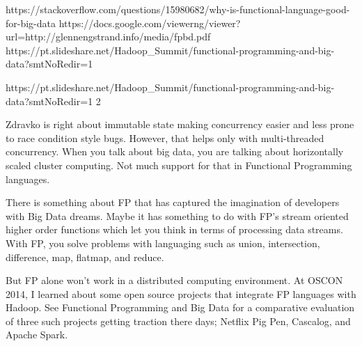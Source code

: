 https://stackoverflow.com/questions/15980682/why-is-functional-language-good-for-big-data
https://docs.google.com/viewerng/viewer?url=http://glennengstrand.info/media/fpbd.pdf
https://pt.slideshare.net/Hadoop_Summit/functional-programming-and-big-data?smtNoRedir=1

https://pt.slideshare.net/Hadoop_Summit/functional-programming-and-big-data?smtNoRedir=1
2

Zdravko is right about immutable state making concurrency easier and less prone to race condition style bugs. However, that helps only with multi-threaded concurrency. When you talk about big data, you are talking about horizontally scaled cluster computing. Not much support for that in Functional Programming languages.

There is something about FP that has captured the imagination of developers with Big Data dreams. Maybe it has something to do with FP's stream oriented higher order functions which let you think in terms of processing data streams. With FP, you solve problems with languaging such as union, intersection, difference, map, flatmap, and reduce.

But FP alone won't work in a distributed computing environment. At OSCON 2014, I learned about some open source projects that integrate FP languages with Hadoop. See Functional Programming and Big Data for a comparative evaluation of three such projects getting traction there days; Netflix Pig Pen, Cascalog, and Apache Spark.
